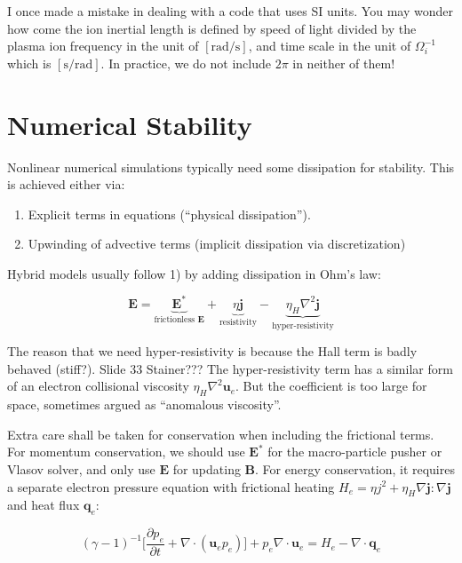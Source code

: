 \documentclass[
  notoc %
]{tufte-book}
\providecommand{\tightlist}{%
  \setlength{\itemsep}{0pt}\setlength{\parskip}{0pt}
}
\begin{document}
I once made a mistake in dealing with a code that uses SI units. You may
wonder how come the ion inertial length is defined by speed of light
divided by the plasma ion frequency in the unit of
\([\text{rad}/\text{s}]\), and time scale in the unit of
\(\Omega_i^{-1}\) which is \([\text{s}/\text{rad}]\). In practice, we do
not include \(2\pi\) in neither of them!

\hypertarget{numerical-stability}{%
\section{Numerical Stability}\label{numerical-stability}}

Nonlinear numerical simulations typically need some dissipation for
stability. This is achieved either via:

\begin{enumerate}
\def\labelenumi{\arabic{enumi}.}
\tightlist
\item
  Explicit terms in equations (``physical dissipation'').
\item
  Upwinding of advective terms (implicit dissipation via discretization)
\end{enumerate}

Hybrid models usually follow 1) by adding dissipation in Ohm's law:

\[
\mathbf{E} = \underbrace{\mathbf{E}^\ast}_{\text{frictionless }\mathbf{E}} + \underbrace{\eta\mathbf{j}}_{\text{resistivity}} - \underbrace{\eta_H \nabla^2\mathbf{j}}_{\text{hyper-resistivity}}
\]

The reason that we need hyper-resistivity is because the Hall term is
badly behaved (stiff?). Slide 33 Stainer??? The hyper-resistivity term
has a similar form of an electron collisional viscosity
\(\eta_H\nabla^2\mathbf{u}_e\). But the coefficient is too large for
space, sometimes argued as ``anomalous viscosity''.

Extra care shall be taken for conservation when including the frictional
terms. For momentum conservation, we should use \(\mathbf{E}^\ast\) for
the macro-particle pusher or Vlasov solver, and only use \(\mathbf{E}\)
for updating \(\mathbf{B}\). For energy conservation, it requires a
separate electron pressure equation with frictional heating
\(H_e = \eta j^2 + \eta_H \nabla \mathbf{j}:\nabla\mathbf{j}\) and heat
flux \(\mathbf{q}_e\):

\[
(\gamma-1)^{-1}\Big[\frac{\partial p_e}{\partial t} + \nabla\cdot(\mathbf{u}_e p_e) \Big] + p_e\nabla\cdot\mathbf{u}_e = H_e - \nabla\cdot\mathbf{q}_e
\]
\end{document}
